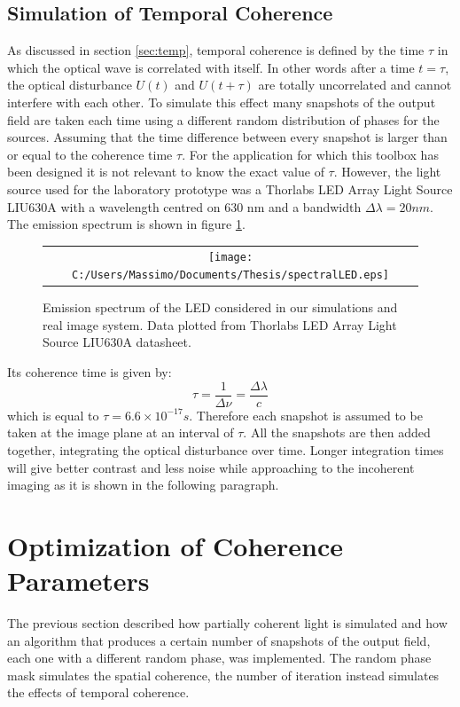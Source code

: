 \subsection{Simulation of Temporal Coherence}
\label{sec:simtempcoherence}
 As discussed in section \ref{sec:temp}, temporal coherence is defined by the time $\tau$ in which the optical wave is correlated with itself. In other words after a time $t=\tau$, the optical disturbance $U(t)$ and $U(t+\tau)$ are totally uncorrelated and cannot interfere with each other. 
To simulate this effect many snapshots of the output field are taken each time using a different random distribution of phases for the sources. Assuming that the time difference between every snapshot is larger than or equal to the coherence time $\tau$. For the application for which this toolbox has been designed it is not relevant to know the exact value of $\tau$. However, the light source used for the laboratory prototype was a Thorlabs LED Array Light Source LIU630A with a wavelength centred on 630 nm and a bandwidth $\Delta\lambda=20 nm$. The emission spectrum is shown in figure \ref{fig:emission_spectrum}.
\begin{figure}[H]
	\begin{center}
		\begin{tabular}{c}
			\texttt{[image: C:/Users/Massimo/Documents/Thesis/spectralLED.eps]}
		\end{tabular}
	\end{center}
	\caption{ \label{fig:emission_spectrum} 
		Emission spectrum of the LED considered in our simulations and real image system. Data plotted from Thorlabs LED Array Light Source LIU630A datasheet. }
\end{figure} 
 Its coherence time is given by:
\begin{equation}
\label{key}
\tau = \dfrac{1}{\Delta\nu}=\dfrac{\Delta\lambda}{c}
\end{equation}
which is equal to $\tau=6.6\times10^{-17} s$. 
 Therefore each snapshot is assumed to be taken at the image plane at an interval of $\tau$. 
 All the snapshots are then added together, integrating the optical disturbance over time. Longer integration times will give better contrast and less noise while approaching to the incoherent imaging as it is shown in the following paragraph.
 \section{Optimization of Coherence Parameters}
 The previous section described how partially coherent light is simulated and how an algorithm that produces a certain number of snapshots of the output field, each one with a different random phase, was implemented. The random phase mask simulates the spatial coherence, the number of iteration instead simulates the effects of temporal coherence.
